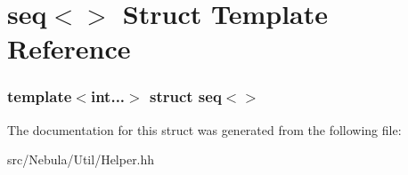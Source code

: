 \hypertarget{structseq}{\section{seq$<$$>$ \-Struct \-Template \-Reference}
\label{structseq}
}
\subsubsection*{template$<$int...$>$ struct seq$<$$>$}



\-The documentation for this struct was generated from the following file\-:\begin{DoxyCompactItemize}
\item 
src/\-Nebula/\-Util/\-Helper.\-hh\end{DoxyCompactItemize}
